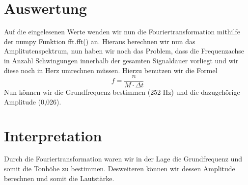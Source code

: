 \documentclass[TGAI_Laborbericht.tex]{subfiles}
\begin{document}
\section{Auswertung}
\label{chap:VERSUCH_1_AUSWERTUNG}
Auf die eingelesenen Werte wenden wir nun die Fouriertransformation mithilfe der numpy Funktion fft.fft() an. Hieraus berechnen wir nun das Amplitutenspektrum, nun haben wir noch das Problem, dass die Frequenzachse in Anzahl Schwingungen innerhalb der gesamten Signaldauer vorliegt und wir diese noch in Herz umrechnen müssen. Hierzu benutzen wir die Formel \[f=\frac{n}{M\cdot \Delta t}\] Nun können wir die Grundfrequenz bestimmen (252 Hz) und die dazugehörige Amplitude (0,026).



\section{Interpretation}
\label{chap:VERSUCH_1_INTERPRETATION}
Durch die Fouriertransformation waren wir in der Lage die Grundfrequenz und somit die Tonhöhe zu bestimmen. Desweiteren können wir dessen Amplitude berechnen und somit die Lautstärke.
\end{document}
